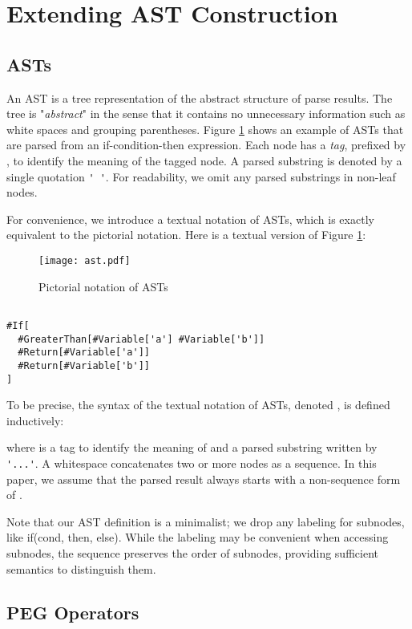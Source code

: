 \documentclass[JIP]{ipsj}
\begin{document}
\section{Extending AST Construction}

\subsection{ASTs}

An AST is a tree representation of the abstract structure of parse results. The tree is "{\em abstract}" in the  sense that it contains no unnecessary information such as white spaces and grouping parentheses. Figure \ref{fig:ast} shows an example of ASTs that are parsed from an if-condition-then expression. Each node has a {\em tag}, prefixed by \kw{\#}, to identify the meaning of the tagged node. A parsed substring is denoted by a single quotation \verb|' '|. For readability, we omit any parsed substrings in non-leaf nodes.  

For convenience, we introduce a textual notation of ASTs, which is exactly equivalent to the pictorial notation. Here is a textual version of Figure \ref{fig:ast}:

\begin{figure}[tb]
\texttt{[image: ast.pdf]}
\caption{Pictorial notation of ASTs}
\label{fig:ast}
\end{figure}

{\small \begin{verbatim}

#If[
  #GreaterThan[#Variable['a'] #Variable['b']]
  #Return[#Variable['a']]
  #Return[#Variable['b']]
] 
\end{verbatim}}

To be precise, the syntax of the textual notation of ASTs, denoted , is defined inductively:



\noindent where  is a tag to identify the meaning of  and a parsed substring written by \verb|'...'|. A whitespace concatenates two or more nodes as a sequence. In this paper, we assume that the parsed result always starts with a non-sequence form of . 

Note that our AST definition is a minimalist; we drop any labeling for subnodes, like if(cond, then, else). While the labeling may be convenient when accessing subnodes, the sequence preserves the order of subnodes, providing sufficient semantics to distinguish them.  

\subsection{PEG Operators}
\end{document}
